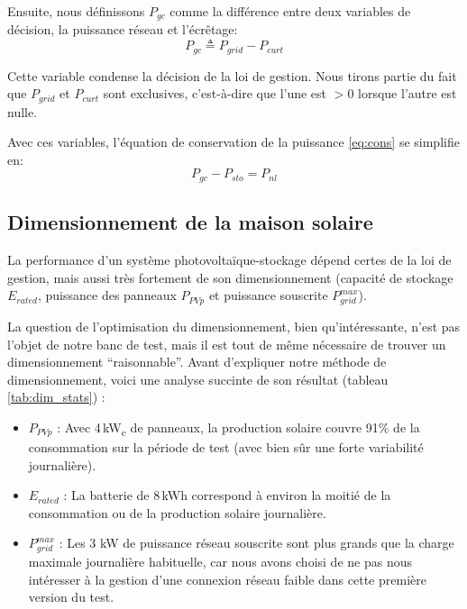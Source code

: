 \documentclass[a4paper,10pt,twocolumn]{article}
\newcommand\sub[1]{\textsubscript{#1}}
\begin{document}
Ensuite, nous définissons $P_{gc}$ comme la différence entre deux variables
de décision, la puissance réseau et l'écrêtage:
%
\begin{equation}
  P_{gc} \triangleq P_{grid} - P_{curt}
\end{equation} 

Cette variable condense la décision de la loi de gestion.
Nous tirons partie du fait que $P_{grid}$ et $P_{curt}$ sont exclusives,
c'est-à-dire que l'une est $>0$ lorsque l'autre est nulle.

Avec ces variables, l'équation de conservation de la puissance \eqref{eq:cons}
se simplifie en:
%
\begin{equation} \label{eq:cons2}
  P_{gc} - P_{sto} = P_{nl}
\end{equation}
%


\subsection{Dimensionnement de la maison solaire}
\label{ss:dimens}

La performance d'un système photovoltaïque-stockage dépend certes de la loi de gestion,
mais aussi très fortement de son dimensionnement
(capacité de stockage $E_{rated}$,
puissance des panneaux $P_{PVp}$ et 
puissance souscrite $P_{grid}^{max}$).

La question de l'optimisation du dimensionnement, bien qu'intéressante,
n'est pas l'objet de notre banc de test, mais il est tout de même nécessaire
de trouver un dimensionnement ``raisonnable''.
%
Avant d'expliquer notre méthode de dimensionnement, voici une analyse
succinte de son résultat (tableau \ref{tab:dim_stats}) :

\begin{itemize}
 \item $P_{PVp}$ : Avec 4\,kW\sub{c} de panneaux, la production solaire couvre 91\%
de la consommation sur la période de test (avec bien sûr une forte variabilité journalière).
 \item $E_{rated}$ : La batterie de 8\,kWh correspond à environ la moitié de la consommation
 ou de la production solaire journalière.
 \item $P_{grid}^{max}$ : Les 3 kW de puissance réseau souscrite sont plus grands
 que la charge maximale journalière habituelle,
 car nous avons choisi de ne pas nous intéresser à la gestion d'une connexion réseau faible
 dans cette première version du test.
\end{itemize}
\end{document}
